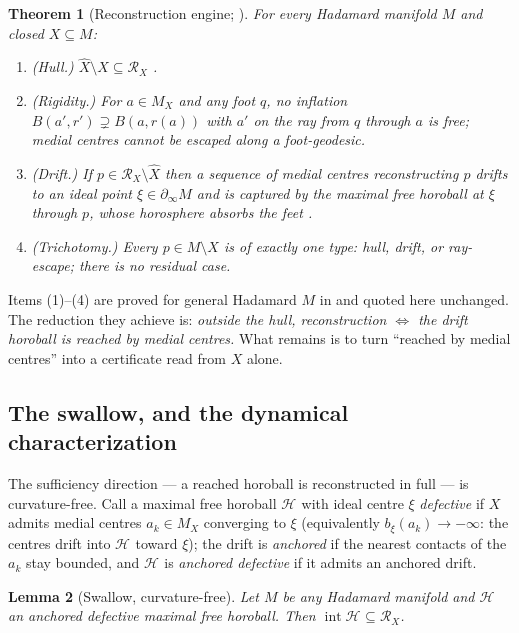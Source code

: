 \documentclass[11pt]{article}
\newtheorem{theorem}{Theorem}[section]
\newtheorem{lemma}[theorem]{Lemma}
\theoremstyle{remark}
\newcommand{\X}{X}
\newcommand{\Xhat}{\widehat{\X}}
\newcommand{\Mx}{M_{\X}}
\newcommand{\Rx}{\mathcal{R}_{\X}}
\newcommand{\Hb}[1]{\mathcal{H}_{#1}}
\newcommand{\bdry}{\partial_{\infty}}
\begin{document}
\begin{theorem}[Reconstruction engine; {\cite{R1,R2}}]
\label{thm:engine}
For every Hadamard manifold $M$ and closed $\X\subseteq M$:
\begin{enumerate}[label=\textup{(\arabic*)}]
\item \emph{(Hull.)} $\Xhat\setminus\X\subseteq\Rx$
  \cite[Thm.~3.1]{R1}.
\item \emph{(Rigidity.)} For $a\in\Mx$ and any foot $q$, no inflation
  $B(a',r')\supsetneq B(a,r(a))$ with $a'$ on the ray from $q$ through
  $a$ is free; medial centres cannot be escaped along a foot-geodesic.
\item \emph{(Drift.)} If $p\in\Rx\setminus\Xhat$ then a sequence of
  medial centres reconstructing $p$ drifts to an ideal point
  $\xi\in\bdry M$ and is captured by the maximal free horoball at
  $\xi$ through $p$, whose horosphere absorbs the feet
  \cite[II.8.13]{BH}.
\item \emph{(Trichotomy.)} Every $p\in M\setminus\X$ is of exactly one
  type: hull, drift, or ray-escape; there is no residual case.
\end{enumerate}
\end{theorem}

Items (1)--(4) are proved for general Hadamard $M$ in \cite{R1,R2} and
quoted here unchanged. The reduction they achieve is: \emph{outside the
hull, reconstruction $\Leftrightarrow$ the drift horoball is reached by
medial centres.} What remains is to turn ``reached by medial centres''
into a certificate read from $X$ alone.

\subsection{The swallow, and the dynamical characterization}

The sufficiency direction --- a reached horoball is reconstructed in
full --- is curvature-free. Call a maximal free horoball $\Hb{}$ with
ideal centre $\xi$ \emph{defective} if $X$ admits medial centres
$a_{k}\in\Mx$ converging to $\xi$ (equivalently $b_{\xi}(a_{k})\to
-\infty$: the centres drift into $\Hb{}$ toward $\xi$); the drift is
\emph{anchored} if the nearest contacts of the $a_{k}$ stay bounded,
and $\Hb{}$ is \emph{anchored defective} if it admits an anchored
drift.

\begin{lemma}[Swallow, curvature-free]\label{lem:swallow}
Let $M$ be \emph{any} Hadamard manifold and $\Hb{}$ an anchored
defective maximal free horoball. Then $\operatorname{int}\Hb{}
\subseteq\Rx$.
\end{lemma}
\end{document}
